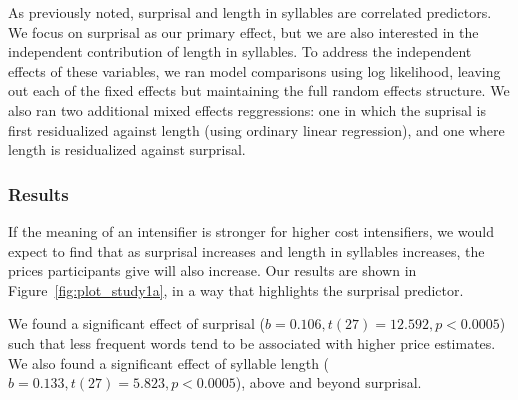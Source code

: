\documentclass[10pt,letterpaper]{article}
\begin{document}
As previously noted, surprisal and length in syllables are correlated predictors. We focus on surprisal as our primary effect, but we are also interested in the independent contribution of length in syllables. To address the independent effects of these variables, we ran model comparisons using log likelihood, leaving out each of the fixed effects but maintaining the full random effects structure. We also ran two additional mixed effects reggressions: one in which the suprisal is first residualized against length (using ordinary linear regression), and one where length is residualized against surprisal.

\subsubsection{Results}

If the meaning of an intensifier is stronger for higher cost intensifiers, we would expect to find that as surprisal increases and length in syllables increases, the prices participants give will also increase. 
Our results are shown in Figure~\ref{fig:plot_study1a}, in a way that highlights the surprisal predictor. 

We found a significant effect of surprisal ($b=0.106, t(27)=12.592, p<0.0005$) such that less frequent words tend to be associated with higher price estimates.
We also found a significant effect of syllable length ($b=0.133, t(27)=5.823, p<0.0005$), above and beyond surprisal.
\end{document}
